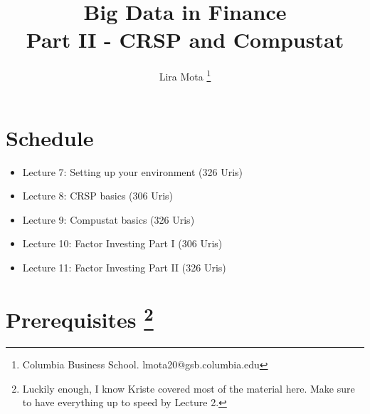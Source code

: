 \documentclass[12pts]{article}
\title{Big Data in Finance\\ \vspace{0.5cm} Part II - CRSP and Compustat}
\author{Lira Mota \thanks{Columbia Business School. lmota20@gsb.columbia.edu}}
\begin{document}
\maketitle

\section*{Schedule}

\begin{itemize}
	\item Lecture 7: Setting up your environment (326 Uris)
	\item Lecture 8: CRSP basics (306 Uris)
	\item Lecture 9: Compustat basics (326 Uris)
	\item Lecture 10: Factor Investing Part I (306 Uris)
	\item Lecture 11: Factor Investing Part II (326 Uris)
\end{itemize}

\section*{Prerequisites \footnote{Luckily enough, I know Kriste covered most of the material here. Make sure to have everything up to speed by Lecture 2.}}
\end{document}
